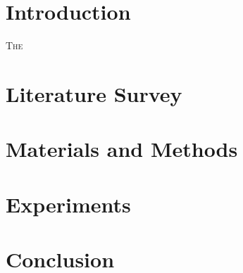 \documentclass[12pt]{ieeeconf}
\begin{document}
\section{Introduction}
\lettrine{T}{he}

\section{Literature Survey}


\section{Materials and Methods}


\section{Experiments}


\section{Conclusion}


\nocite{*}


\end{document}
